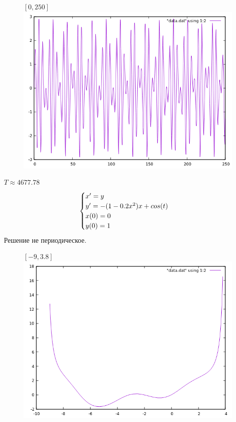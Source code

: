 \documentclass[12pt, a4paper] {article}
\theoremstyle{remark}
\theoremstyle{definition}
\begin{document}
\newpage
\begin{figure}[h!]
$[0, 250]$ \\
\centering
\includegraphics[width=1\linewidth]{solve_plus_250.png} 
\end{figure}
$T \approx 4677.78$
\newpage
\begin{gather}
\begin{cases}
\notag x' = y \\
\notag y' = -(1 - 0.2x^2)x + cos(t) \\
\notag x(0) = 0 \\
\notag y(0) = 1
\end{cases}
\end{gather}
Решение не периодическое.
\begin{figure}[h!]
$[-9, 3.8]$ \\
\centering
\includegraphics[width=1\linewidth]{min_3.png} 
\end{figure}
\end{document}
